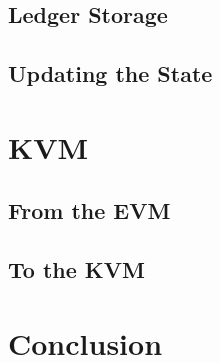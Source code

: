 \documentclass{article}
\begin{document}
\subsection{Ledger Storage}


\subsection{Updating the State}


\newpage
\section{KVM}



\subsection{From the EVM}



\subsection{To the KVM}



\newpage
\section*{Conclusion}






\end{document}
